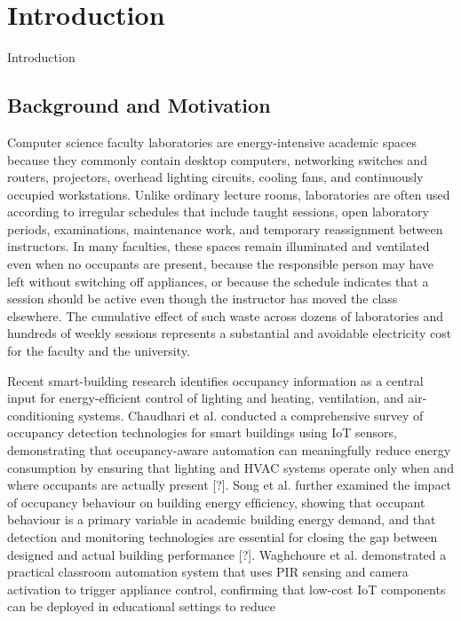 
\chapter{Introduction}
\label{ch:introduction}



Introduction

\section{Background and Motivation}


Computer science faculty laboratories are energy-intensive academic spaces because they
commonly contain desktop computers, networking switches and routers, projectors, overhead lighting circuits, cooling fans, and continuously occupied workstations. Unlike ordinary lecture rooms, laboratories are often used according to irregular schedules that include
taught sessions, open laboratory periods, examinations, maintenance work, and temporary
reassignment between instructors. In many faculties, these spaces remain illuminated and
ventilated even when no occupants are present, because the responsible person may have
left without switching off appliances, or because the schedule indicates that a session should
be active even though the instructor has moved the class elsewhere. The cumulative effect
of such waste across dozens of laboratories and hundreds of weekly sessions represents a
substantial and avoidable electricity cost for the faculty and the university.

Recent smart-building research identiﬁes occupancy information as a central input for
energy-efﬁcient control of lighting and heating, ventilation, and air-conditioning systems.
Chaudhari et al. conducted a comprehensive survey of occupancy detection technologies
for smart buildings using IoT sensors, demonstrating that occupancy-aware automation can
meaningfully reduce energy consumption by ensuring that lighting and HVAC systems operate only when and where occupants are actually present [?]. Song et al. further examined
the impact of occupancy behaviour on building energy efﬁciency, showing that occupant
behaviour is a primary variable in academic building energy demand, and that detection
and monitoring technologies are essential for closing the gap between designed and actual
building performance [?]. Waghchoure et al. demonstrated a practical classroom automation system that uses PIR sensing and camera activation to trigger appliance control, conﬁrming that low-cost IoT components can be deployed in educational settings to reduce

